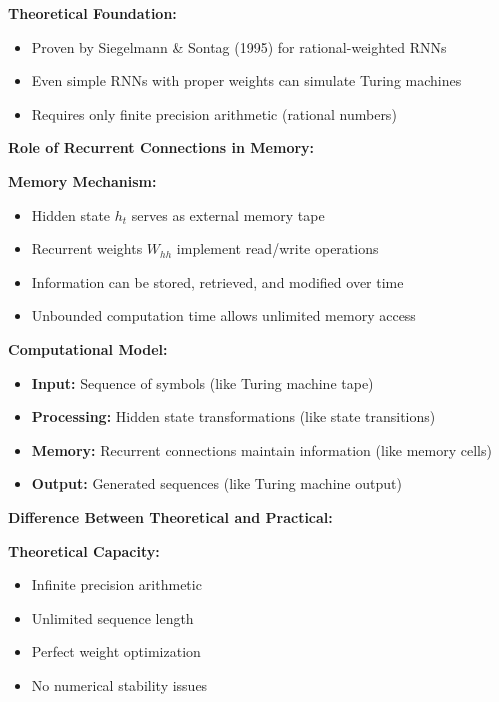 \documentclass[12pt]{article}
\begin{document}
\begin{enumerate}[(a)]
{    \textbf{Theoretical Foundation:}
    \begin{itemize}
        \item Proven by Siegelmann \& Sontag (1995) for rational-weighted RNNs
        \item Even simple RNNs with proper weights can simulate Turing machines
        \item Requires only finite precision arithmetic (rational numbers)
    \end{itemize}
    
    \textbf{Role of Recurrent Connections in Memory:}
    
    \textbf{Memory Mechanism:}
    \begin{itemize}
        \item Hidden state $h_t$ serves as external memory tape
        \item Recurrent weights $W_{hh}$ implement read/write operations
        \item Information can be stored, retrieved, and modified over time
        \item Unbounded computation time allows unlimited memory access
    \end{itemize}
    
    \textbf{Computational Model:}
    \begin{itemize}
        \item \textbf{Input:} Sequence of symbols (like Turing machine tape)
        \item \textbf{Processing:} Hidden state transformations (like state transitions)
        \item \textbf{Memory:} Recurrent connections maintain information (like memory cells)
        \item \textbf{Output:} Generated sequences (like Turing machine output)
    \end{itemize}
    
    \textbf{Difference Between Theoretical and Practical:}
    
    \textbf{Theoretical Capacity:}
    \begin{itemize}
        \item Infinite precision arithmetic
        \item Unlimited sequence length
        \item Perfect weight optimization
        \item No numerical stability issues
    \end{itemize}
    
}
\end{enumerate}
\end{document}
